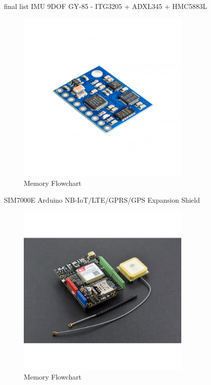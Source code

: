 final list
IMU 9DOF GY-85 - ITG3205 + ADXL345 + HMC5883L
\begin{figure}[H]
    \centering
    \includegraphics[width=0.75\textwidth]{images/chapter/design/components/final_IMU.png}  %
    \caption{Memory Flowchart}
    \label{fig:Memory Flowchart}        
\end{figure}

SIM7000E Arduino NB-IoT/LTE/GPRS/GPS Expansion Shield

\begin{figure}[H]
    \centering
    \includegraphics[width=0.75\textwidth]{images/chapter/design/components/SIM7000.png}  %
    \caption{Memory Flowchart}
    \label{fig:Memory Flowchart}        
\end{figure}

